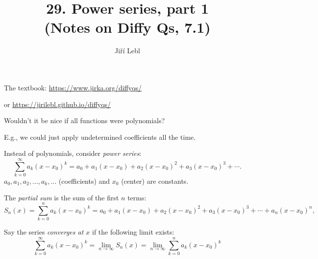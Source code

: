 \documentclass[10pt,aspectratio=169]{beamer}
\author{Ji\v{r}\'i Lebl}
\institute[OSU]{%
Oklahoma State University%
}
\title{29. Power series, part 1\\(Notes on Diffy Qs, 7.1)}
\date{}
\begin{document}
\begin{frame}
\titlepage


\begin{center}
The textbook: \url{https://www.jirka.org/diffyqs/}

or \url{https://jirilebl.github.io/diffyqs/}
\end{center}
\end{frame}

\begin{frame}
Wouldn't it be nice if all functions were polynomials?

E.g., we could just apply undetermined coefficients all the time.

\pause
\medskip

Instead of polynomials, consider \emph{power series}:
\[
\sum_{k=0}^\infty a_k {(x-x_0)}^k =
a_0 + 
a_1 (x-x_0) +
a_2 {(x-x_0)}^2 +
a_3 {(x-x_0)}^3 + \cdots.
\]
$a_0,a_1,a_2,\ldots,a_k,\ldots$ (coefficients) and $x_0$ (center) are
constants.

\pause
\medskip

The \emph{partial sum} is the sum of the first $n$ terms:
\[
S_n(x)
=
\sum_{k=0}^n a_k {(x-x_0)}^k
=
a_0 + a_1 (x-x_0) + a_2 {(x-x_0)}^2 + a_3 {(x-x_0)}^3 + \cdots + a_n {(x-x_0)}^n ,
\]

\pause
Say the series \emph{converges at $x$} if the following limit exists:
\[
\sum_{k=0}^\infty a_k {(x-x_0)}^k = 
\lim_{n\to \infty} S_n(x) = \lim_{n\to\infty} \sum_{k=0}^n a_k {(x-x_0)}^k
\]
\end{frame}
\end{document}
